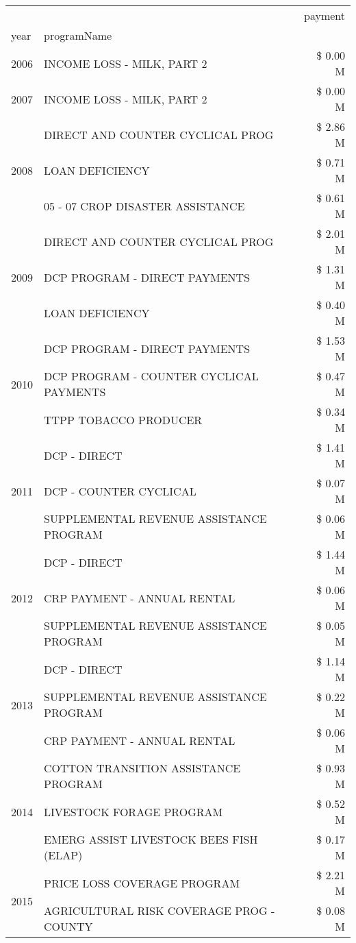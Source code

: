 \begin{tabular}{llr}
\toprule
 &  & payment \\
year & programName &  \\
\midrule
2006 & INCOME LOSS - MILK, PART 2 & \$ 0.00 M \\
\cline{1-3}
2007 & INCOME LOSS - MILK, PART 2 & \$ 0.00 M \\
\cline{1-3}
\multirow[t]{3}{*}{2008} & DIRECT AND COUNTER CYCLICAL PROG & \$ 2.86 M \\
 & LOAN DEFICIENCY & \$ 0.71 M \\
 & 05 - 07 CROP DISASTER ASSISTANCE & \$ 0.61 M \\
\cline{1-3}
\multirow[t]{3}{*}{2009} & DIRECT AND COUNTER CYCLICAL PROG & \$ 2.01 M \\
 & DCP PROGRAM - DIRECT PAYMENTS & \$ 1.31 M \\
 & LOAN DEFICIENCY & \$ 0.40 M \\
\cline{1-3}
\multirow[t]{3}{*}{2010} & DCP PROGRAM - DIRECT PAYMENTS & \$ 1.53 M \\
 & DCP PROGRAM - COUNTER CYCLICAL PAYMENTS & \$ 0.47 M \\
 & TTPP TOBACCO PRODUCER & \$ 0.34 M \\
\cline{1-3}
\multirow[t]{3}{*}{2011} & DCP - DIRECT & \$ 1.41 M \\
 & DCP - COUNTER CYCLICAL & \$ 0.07 M \\
 & SUPPLEMENTAL REVENUE ASSISTANCE PROGRAM & \$ 0.06 M \\
\cline{1-3}
\multirow[t]{3}{*}{2012} & DCP - DIRECT & \$ 1.44 M \\
 & CRP PAYMENT - ANNUAL RENTAL & \$ 0.06 M \\
 & SUPPLEMENTAL REVENUE ASSISTANCE PROGRAM & \$ 0.05 M \\
\cline{1-3}
\multirow[t]{3}{*}{2013} & DCP - DIRECT & \$ 1.14 M \\
 & SUPPLEMENTAL REVENUE ASSISTANCE PROGRAM & \$ 0.22 M \\
 & CRP PAYMENT - ANNUAL RENTAL & \$ 0.06 M \\
\cline{1-3}
\multirow[t]{3}{*}{2014} & COTTON TRANSITION ASSISTANCE PROGRAM & \$ 0.93 M \\
 & LIVESTOCK FORAGE PROGRAM & \$ 0.52 M \\
 & EMERG ASSIST LIVESTOCK BEES FISH (ELAP) & \$ 0.17 M \\
\cline{1-3}
\multirow[t]{3}{*}{2015} & PRICE LOSS COVERAGE PROGRAM & \$ 2.21 M \\
 & AGRICULTURAL RISK COVERAGE PROG - COUNTY & \$ 0.08 M \\

\end{tabular}
